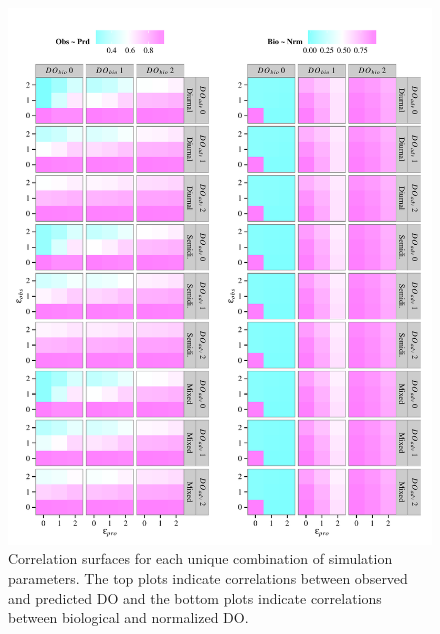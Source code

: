 \documentclass{article}\usepackage{graphicx, color}
\makeatletter
\def\maxwidth{ %
  \ifdim\Gin@nat@width>\linewidth
    \linewidth
  \else
    \Gin@nat@width
  \fi
}
\newenvironment{knitrout}{}{} %
\makeatother
\begin{document}
\begin{knitrout}
\color{fgcolor}\begin{figure}[!h]


{\centering \includegraphics[width=\maxwidth]{figure/cor_surf} 

}

\caption[Correlation surfaces for each unique combination of simulation parameters]{Correlation surfaces for each unique combination of simulation parameters.  The top plots indicate correlations between observed and predicted DO and the bottom plots indicate correlations between biological and normalized DO.\label{fig:cor_surf}}
\end{figure}


\end{knitrout}

\clearpage
\end{document}
